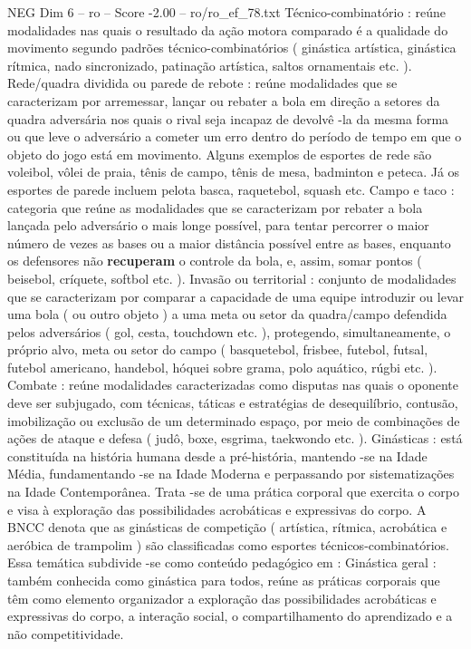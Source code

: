 \begin{textsample}{NEG Dim 6 – ro – Score -2.00 – ro/ro\_ef\_78.txt}
Técnico-combinatório : reúne modalidades nas quais o resultado da ação motora comparado é a qualidade do movimento segundo padrões técnico-combinatórios ( ginástica artística, ginástica rítmica, nado sincronizado, patinação artística, saltos ornamentais etc. ).
Rede/quadra dividida ou parede de rebote : reúne modalidades que se caracterizam por arremessar, lançar ou rebater a bola em direção a setores da quadra adversária nos quais o rival seja incapaz de devolvê -la da mesma forma ou que leve o adversário a cometer um erro dentro do período de tempo em que o objeto do jogo está em movimento.
Alguns exemplos de esportes de rede são voleibol, vôlei de praia, tênis de campo, tênis de mesa, badminton e peteca.
Já os esportes de parede incluem pelota basca, raquetebol, squash etc.
Campo e taco : categoria que reúne as modalidades que se caracterizam por rebater a bola lançada pelo adversário o mais longe possível, para tentar percorrer o maior número de vezes as bases ou a maior distância possível entre as bases, enquanto os defensores não \textbf{recuperam} o controle da bola, e, assim, somar pontos ( beisebol, críquete, softbol etc. ).
Invasão ou territorial : conjunto de modalidades que se caracterizam por comparar a capacidade de uma equipe introduzir ou levar uma bola ( ou outro objeto ) a uma meta ou setor da quadra/campo defendida pelos adversários ( gol, cesta, touchdown etc. ), protegendo, simultaneamente, o próprio alvo, meta ou setor do campo ( basquetebol, frisbee, futebol, futsal, futebol americano, handebol, hóquei sobre grama, polo aquático, rúgbi etc. ).
Combate : reúne modalidades caracterizadas como disputas nas quais o oponente deve ser subjugado, com técnicas, táticas e estratégias de desequilíbrio, contusão, imobilização ou exclusão de um determinado espaço, por meio de combinações de ações de ataque e defesa ( judô, boxe, esgrima, taekwondo etc. ).
Ginásticas : está constituída na história humana desde a pré-história, mantendo -se na Idade Média, fundamentando -se na Idade Moderna e perpassando por sistematizações na Idade Contemporânea.
Trata -se de uma prática corporal que exercita o corpo e visa à exploração das possibilidades acrobáticas e expressivas do corpo.
A BNCC denota que as ginásticas de competição ( artística, rítmica, acrobática e aeróbica de trampolim ) são classificadas como esportes técnicos-combinatórios.
Essa temática subdivide -se como conteúdo pedagógico em : Ginástica geral : também conhecida como ginástica para todos, reúne as práticas corporais que têm como elemento organizador a exploração das possibilidades acrobáticas e expressivas do corpo, a interação social, o compartilhamento do aprendizado e a não competitividade.

\end{textsample}
